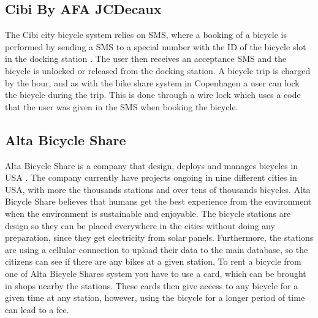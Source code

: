\subsection{Cibi By AFA JCDecaux}
The Cibi city bicycle system relies on SMS, where a booking of a bicycle is performed by sending a SMS to a special number with the ID of the bicycle slot in the docking station \citep{misc:cibi}.
The user then receives an acceptance SMS and the bicycle is unlocked or released from the docking station. 
A bicycle trip is charged by the hour, and as with the bike share system in Copenhagen a user can lock the bicycle during the trip. 
This is done through a wire lock which uses a code that the user was given in the SMS when booking the bicycle.

\subsection{Alta Bicycle Share}
Alta Bicycle Share is a company that design, deploys and manages bicycles in USA \citep{misc:AltaBicycleShare}.
The company currently have projects ongoing in nine different cities in USA, with more the thousands stations and over tens of thousands bicycles. 
Alta Bicycle Share believes that humans get the best experience from the environment when the environment is sustainable and enjoyable.
The bicycle stations are design so they can be placed everywhere in the cities without doing any preparation, since they get electricity from solar panels.
Furthermore, the stations are using a cellular connection to upload their data to the main database, so the citizens can see if there are any bikes at a given station.
To rent a bicycle from one of Alta Bicycle Shares system you have to use a card, which can be brought in shops nearby the stations.
These cards then give access to any bicycle for a given time at any station, however, using the bicycle for a longer period of time can lead to a fee.


